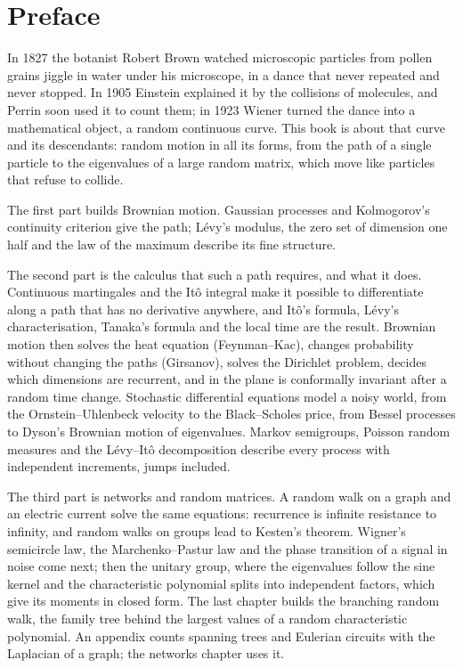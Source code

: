 \chapter*{Preface}
In 1827 the botanist Robert Brown watched microscopic particles from pollen grains jiggle in water under his microscope, in a dance that never repeated and never stopped. In 1905 Einstein explained it by the collisions of molecules, and
Perrin soon used it to count them; in 1923 Wiener turned the dance into a mathematical object, a random continuous curve. This book is about that curve and its descendants: random motion in all its forms, from the path of a
single particle to the eigenvalues of a large random matrix, which move like particles that refuse to collide.

The first part builds Brownian motion. Gaussian processes and Kolmogorov's continuity criterion give the path; L\'evy's modulus,
the zero set of dimension one half and the law of the maximum describe its fine structure.

The second part is the calculus that such a path requires, and what it does. Continuous martingales and the It\^o integral make it
possible to differentiate along a path that has no derivative anywhere, and It\^o's formula, L\'evy's characterisation, Tanaka's
formula and the local time are the result. Brownian motion then solves the heat equation (Feynman--Kac), changes probability
without changing the paths (Girsanov), solves the Dirichlet problem, decides which dimensions are recurrent, and in the plane is
conformally invariant after a random time change. Stochastic differential equations model a noisy world, from the Ornstein--Uhlenbeck velocity
to the Black--Scholes price, from Bessel processes to Dyson's Brownian motion of eigenvalues. Markov semigroups, Poisson random
measures and the L\'evy--It\^o decomposition describe every process with independent increments, jumps included.

The third part is networks and random matrices. A random walk on a graph and an electric current solve the same equations:
recurrence is infinite resistance to infinity, and random walks on groups lead to Kesten's theorem. Wigner's semicircle law,
the Marchenko--Pastur law and the phase transition of a signal in noise come next; then the unitary group, where the eigenvalues
follow the sine kernel and the characteristic polynomial splits into independent factors, which give its moments in closed form.
The last chapter builds the branching random walk, the family tree behind the largest values of a random characteristic
polynomial. An appendix counts spanning trees and Eulerian circuits with the Laplacian of a graph; the networks chapter uses it.

